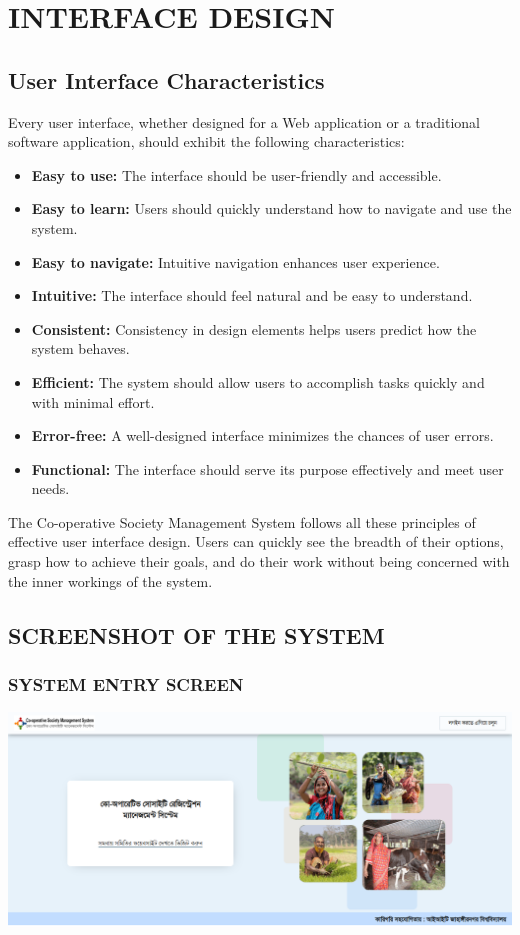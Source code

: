 \chapter{INTERFACE DESIGN}

\section{User Interface Characteristics}

Every user interface, whether designed for a Web application or a traditional software application, should exhibit the following characteristics:

\begin{itemize}
  \item \textbf{Easy to use:} The interface should be user-friendly and accessible.
  \item \textbf{Easy to learn:} Users should quickly understand how to navigate and use the system.
  \item \textbf{Easy to navigate:} Intuitive navigation enhances user experience.
  \item \textbf{Intuitive:} The interface should feel natural and be easy to understand.
  \item \textbf{Consistent:} Consistency in design elements helps users predict how the system behaves.
  \item \textbf{Efficient:} The system should allow users to accomplish tasks quickly and with minimal effort.
  \item \textbf{Error-free:} A well-designed interface minimizes the chances of user errors.
  \item \textbf{Functional:} The interface should serve its purpose effectively and meet user needs.
\end{itemize}

The Co-operative Society Management System follows all these principles of effective user interface design. Users can quickly see the breadth of their options, grasp how to achieve their goals, and do their work without being concerned with the inner workings of the system.

\section{SCREENSHOT OF THE SYSTEM}

\subsection{SYSTEM ENTRY SCREEN}
  \includegraphics[width=14cm]{Chap4/1.png}

